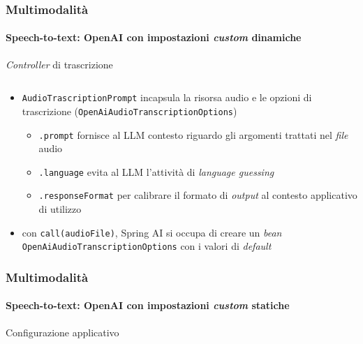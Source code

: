 \begin{frame}[t,fragile] \frametitle{Multimodalità}
    \framesubtitle{Speech-to-text: OpenAI con impostazioni \textit{custom} dinamiche}
    \vspace*{-.7cm}   
    {\footnotesize
        \begin{block}{\textit{Controller} di trascrizione}
			{\tiny\inputminted{java}{code/AudioControllerCustom.java}}
    	\end{block}
        \vspace*{.1cm}
        \begin{itemize}[leftmargin=10pt,align=right]
            \item[\alert{\faArrowCircleRight}] \alert{\texttt{AudioTrascriptionPrompt}} incapsula la risorsa audio e le opzioni di trascrizione (\alert{\texttt{OpenAiAudioTranscriptionOptions}})
            \begin{itemize}[leftmargin=10pt,align=right]
                \item[\alert{\faArrowCircleRight}] \alert{\texttt{.prompt}} fornisce al LLM contesto riguardo gli argomenti trattati nel \textit{file} audio
                \item[\alert{\faArrowCircleRight}] \alert{\texttt{.language}} evita al LLM l'attività di \textit{language guessing}
                \item[\alert{\faArrowCircleRight}] \alert{\texttt{.responseFormat}} per calibrare il formato di \textit{output} al contesto applicativo di utilizzo
            \end{itemize}
            \item[\alert{\faExclamationTriangle}] con \texttt{call(audioFile)}, Spring AI si occupa di creare un \textit{bean} \texttt{OpenAiAudioTranscriptionOptions} con i valori di \textit{default}
        \end{itemize}      
    }
\end{frame}    
%
\begin{frame}[t,fragile] \frametitle{Multimodalità}
    \framesubtitle{Speech-to-text: OpenAI con impostazioni \textit{custom} statiche} 
    {\footnotesize
        \begin{block}{Configurazione applicativo}
			{\tiny\inputminted{yaml}{code/application-stt.yml}}
    	\end{block}    
    }
\end{frame}    
%
